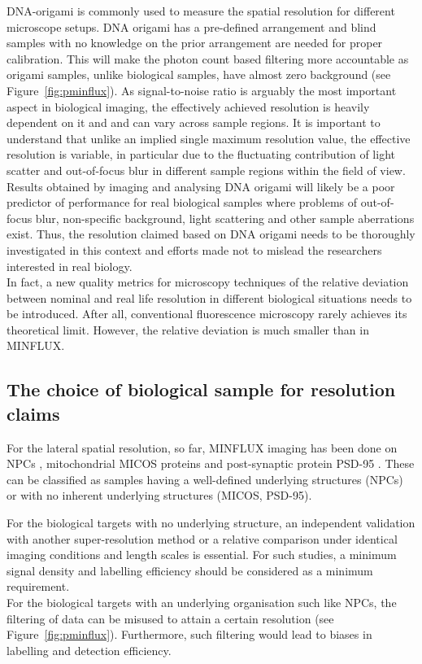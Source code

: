\documentclass[9pt,twocolumn,twoside]{pnas-new}
\begin{document}
DNA-origami is commonly used to measure the spatial resolution for different microscope setups. DNA origami has a pre-defined arrangement and blind samples with no knowledge on the prior arrangement are needed for proper calibration. This will make the photon count based filtering  more accountable as origami samples, unlike biological samples, have almost zero background (see Figure~\ref{fig:pminflux}). 
As signal-to-noise ratio is arguably the most important aspect in biological imaging, the effectively achieved resolution is heavily dependent on it and and can vary across sample regions. It is important to understand that unlike an implied single maximum resolution value, the effective resolution is variable, in particular due to the fluctuating contribution of light scatter and out-of-focus blur in different sample regions within the field of view. \\
Results obtained by imaging and analysing DNA origami will likely be a poor predictor of performance for real biological samples where problems of out-of-focus blur, non-specific background, light scattering and other sample aberrations exist. Thus, the resolution claimed based on DNA origami needs to be thoroughly investigated in this context and efforts made not to mislead the researchers interested in real biology. \\
In fact, a new quality metrics for microscopy techniques of the relative deviation between nominal and real life resolution in different biological situations needs to be introduced. After all, conventional fluorescence microscopy rarely achieves its theoretical limit. However, the relative deviation is much smaller than in MINFLUX. 

\subsection{The choice of biological sample for resolution claims}
For the lateral spatial resolution, so far, MINFLUX imaging has been done on NPCs \citep{gwosch2020minflux}, mitochondrial MICOS proteins \citep{pape2020multicolor} and post-synaptic protein PSD-95 \citep{gwosch2020minflux}. These can be classified as samples having a well-defined underlying structures (NPCs) or with no inherent underlying structures (MICOS, PSD-95). 

For the biological targets with no underlying structure, an independent validation with another super-resolution method or a relative comparison under identical imaging conditions and length scales is essential. For such studies, a minimum signal density and labelling efficiency should be considered as a minimum requirement.\\
For the biological targets with an underlying organisation such like NPCs, the filtering of data can be misused to attain a certain resolution (see Figure~\ref{fig:pminflux}). Furthermore, such filtering would lead to biases in labelling and detection efficiency. 
 
\end{document}
